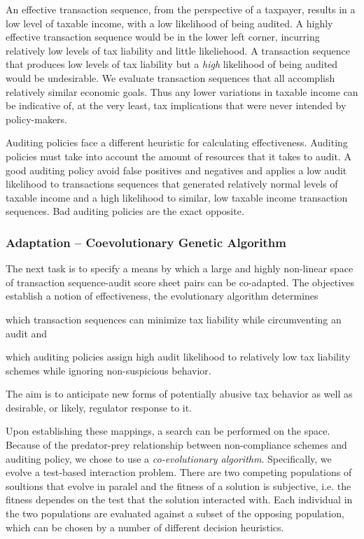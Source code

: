 An effective transaction sequence, from the perspective of a taxpayer,
results in a low level of taxable income, with a low likelihood of
being audited. A highly effective transaction sequence would be in the
lower left corner, incurring relatively low levels of tax liability
and little likeliehood. A transaction sequence that produces low
levels of tax liability but a \textit{high} likelihood of being
audited would be undesirable. We evaluate transaction sequences that
all accomplish relatively similar economic goals. Thus any lower
variations in taxable income can be indicative of, at the very least,
tax implications that were never intended by policy-makers.

Auditing policies face a different heuristic for calculating
effectiveness. Auditing policies must take into account the amount of
resources that it takes to audit. A good auditing policy avoid false
positives and negatives and applies a low audit likelihood to
transactions sequences that generated relatively normal levels of
taxable income and a high likelihood to similar, low taxable income
transaction sequences. Bad auditing policies are the exact opposite.

\subsubsection{Adaptation -- Coevolutionary Genetic Algorithm}
\label{sec:searching}

The next task is to specify a means by which a large and highly
non-linear space of transaction sequence-audit score sheet pairs can
be co-adapted. The objectives establish a notion of effectiveness, the
evolutionary algorithm determines
\begin{inparaenum}[\itshape a)]
\item which transaction sequences can minimize tax liability
  while circumventing an audit and
\item which auditing policies assign high audit likelihood to
  relatively low tax liability schemes while ignoring
  non-suspicious behavior.
\end{inparaenum}
The aim is to anticipate new forms of potentially abusive tax behavior
as well as desirable, or likely, regulator response to it.

Upon establishing these mappings, a search can be performed on the
space. Because of the predator-prey relationship between
non-compliance schemes and auditing policy, we chose to use a
\textit{co-evolutionary algorithm}. Specifically, we evolve a
test-based interaction problem. There are two competing populations of
soultions that evolve in paralel and the fitness of a solution is
subjective, i.e. the fitness dependes on the test that the solution
interacted with. Each individual in the two populations are evaluated
against a subset of the opposing population, which can be chosen by a
number of different decision heuristics.

